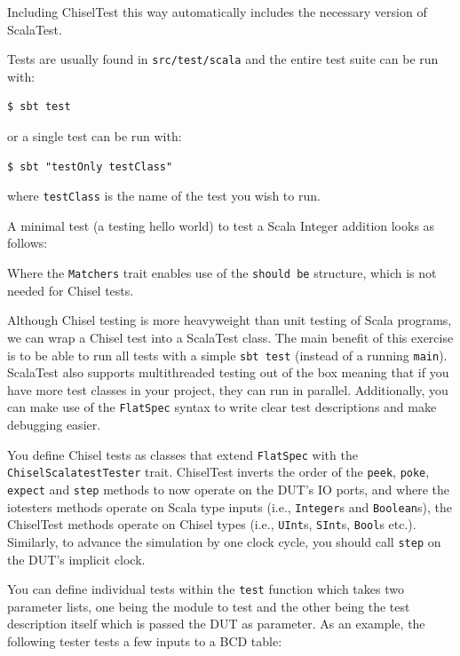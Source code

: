 \documentclass[%
    10pt,
    headinclude, footexclude,
    openright, %
    notitlepage,
    cleardoubleempty,
    headsepline,
    pointlessnumbers,
    bibtotoc, idxtotoc,
    ]{scrbook}
\newcommand{\code}[1]{{\small{\texttt{#1}}}}
\begin{document}
\noindent Including ChiselTest this way automatically includes the necessary version of ScalaTest.

\noindent Tests are usually found in \code{src/test/scala} and the entire test suite can be run with:

\begin{verbatim}
$ sbt test
\end{verbatim}

or a single test can be run with:

\begin{verbatim}
$ sbt "testOnly testClass"
\end{verbatim}

where \code{testClass} is the name of the test you wish to run.

\noindent A minimal test (a testing hello world) to test a Scala Integer
addition looks as follows:


Where the \code{Matchers} trait enables use of the \code{should be} structure, which is not 
needed for Chisel tests.

\noindent Although Chisel testing is more heavyweight than unit testing of Scala programs,
we can wrap a Chisel test into a ScalaTest class. The main benefit of this exercise is to 
be able to run all tests with a simple \code{sbt test} (instead of a running \code{main}). 
ScalaTest also supports multithreaded testing out of the box meaning that if you have more 
test classes in your project, they can run in parallel. Additionally, you can make use of 
the \code{FlatSpec} syntax to write clear test descriptions and make debugging easier.

\noindent You define Chisel tests as classes that extend \code{FlatSpec} with 
the \code{ChiselScalatestTester} trait. ChiselTest inverts the order of the \code{peek}, 
\code{poke}, \code{expect} and \code{step} methods to now operate on the DUT's IO ports, 
and where the iotesters methods operate on Scala type inputs (i.e., \code{Integer}s and 
\code{Boolean}s), the ChiselTest methods operate on Chisel types (i.e., \code{UInt}s, 
\code{SInt}s, \code{Bool}s etc.). Similarly, to advance the simulation by one clock cycle, 
you should call \code{step} on the DUT's implicit clock.

You can define individual tests within the \code{test} function which takes two parameter 
lists, one being the module to test and the other being the test description itself which 
is passed the DUT as parameter. As an example, the following tester tests a few inputs to 
a BCD table:
\end{document}

